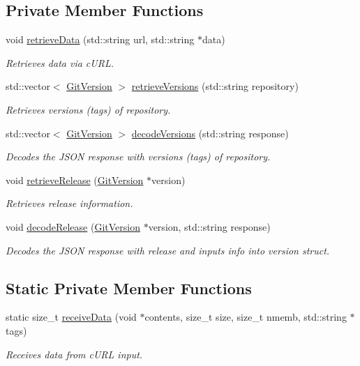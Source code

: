 \subsection*{Private Member Functions}
\begin{DoxyCompactItemize}
\item 
void \hyperlink{classVersionChecker_ac758c0752d07f453f11357fac439011d}{retrieve\-Data} (std\-::string url, std\-::string $\ast$data)
\begin{DoxyCompactList}\small\item\em Retrieves data via c\-U\-R\-L. \end{DoxyCompactList}\item 
std\-::vector$<$ \hyperlink{structGitVersion}{Git\-Version} $>$ \hyperlink{classVersionChecker_a9f648fee93cd911d85c34af34c2f1b0a}{retrieve\-Versions} (std\-::string repository)
\begin{DoxyCompactList}\small\item\em Retrieves versions (tags) of repository. \end{DoxyCompactList}\item 
std\-::vector$<$ \hyperlink{structGitVersion}{Git\-Version} $>$ \hyperlink{classVersionChecker_a8dea3d22c0a7ef3928f9da73bebb8295}{decode\-Versions} (std\-::string response)
\begin{DoxyCompactList}\small\item\em Decodes the J\-S\-O\-N response with versions (tags) of repository. \end{DoxyCompactList}\item 
void \hyperlink{classVersionChecker_aa993a71dc58cfb6a3840235fe3fa4d27}{retrieve\-Release} (\hyperlink{structGitVersion}{Git\-Version} $\ast$version)
\begin{DoxyCompactList}\small\item\em Retrieves release information. \end{DoxyCompactList}\item 
void \hyperlink{classVersionChecker_a5b27ec7321df94dff2876c260c75fea0}{decode\-Release} (\hyperlink{structGitVersion}{Git\-Version} $\ast$version, std\-::string response)
\begin{DoxyCompactList}\small\item\em Decodes the J\-S\-O\-N response with release and inputs info into version struct. \end{DoxyCompactList}\end{DoxyCompactItemize}
\subsection*{Static Private Member Functions}
\begin{DoxyCompactItemize}
\item 
static size\-\_\-t \hyperlink{classVersionChecker_a08332369b0012d1fa919471b559a13b1}{receive\-Data} (void $\ast$contents, size\-\_\-t size, size\-\_\-t nmemb, std\-::string $\ast$tags)
\begin{DoxyCompactList}\small\item\em Receives data from c\-U\-R\-L input. \end{DoxyCompactList}\end{DoxyCompactItemize}


